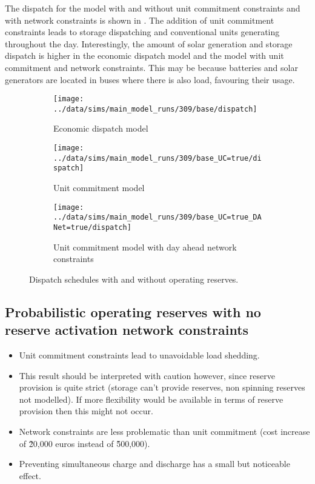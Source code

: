 \documentclass[number,times]{elsarticle}
\begin{document}
The dispatch for the model with and without unit commitment constraints and with network constraints is shown in . The addition of unit commitment constraints leads to storage dispatching and conventional units generating throughout the day. Interestingly, the amount of solar generation and storage dispatch is higher in the economic dispatch model and the model with unit commitment and network constraints. This may be because batteries and solar generators are located in buses where there is also load, favouring their usage.

\begin{figure}[H]
    \centering
    \begin{subfigure}[t]{0.7\textwidth}
        \centering
        \texttt{[image: ../data/sims/main\_model\_runs/309/base/dispatch]}
        \caption{Economic dispatch model}
    \end{subfigure}
    \begin{subfigure}[t]{0.7\textwidth}
        \centering
        \texttt{[image: ../data/sims/main\_model\_runs/309/base\_UC=true/dispatch]}
        \caption{Unit commitment model}
    \end{subfigure}
    \begin{subfigure}[t]{0.7\textwidth}
        \centering
        \texttt{[image: ../data/sims/main\_model\_runs/309/base\_UC=true\_DANet=true/dispatch]}
        \caption{Unit commitment model with day ahead network constraints}
    \end{subfigure}
    \caption{Dispatch schedules with and without operating reserves.\label{fig:dispatch_base}}
\end{figure}

\subsection{Probabilistic operating reserves with no reserve activation network constraints}

\begin{itemize}
    \item Unit commitment constraints lead to unavoidable load shedding.
    \item This result should be interpreted with caution however, since reserve provision is quite strict (storage can't provide reserves, non spinning reserves not modelled). If more flexibility would be available in terms of reserve provision then this might not occur.
    \item Network constraints are less problematic than unit commitment (cost increase of \~20,000 euros instead of \~500,000).
    \item Preventing simultaneous charge and discharge has a small but noticeable effect.
\end{itemize}
\end{document}
